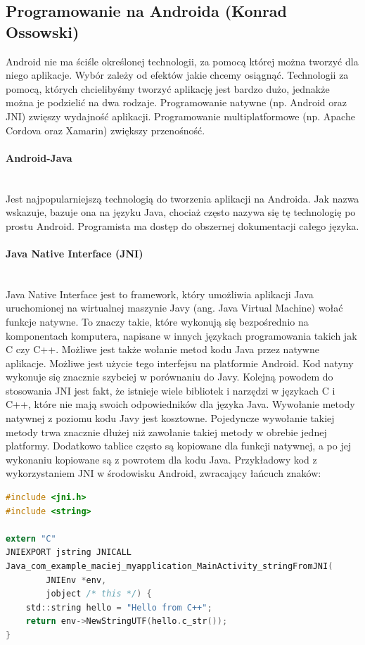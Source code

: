 \subsection{Programowanie na Androida (Konrad Ossowski)}
Android nie ma ściśle określonej technologii, za pomocą której można tworzyć dla niego aplikacje. Wybór zależy od efektów jakie chcemy osiągnąć. Technologii za pomocą, których chcielibyśmy tworzyć aplikację jest bardzo dużo, jednakże można je podzielić na dwa rodzaje. Programowanie natywne (np. Android oraz JNI) zwięszy wydajność aplikacji. Programowanie multiplatformowe (np. Apache Cordova oraz Xamarin) zwiększy przenośność. 
\paragraph{Android-Java}\mbox{}\\
Jest najpopularniejszą technologią do tworzenia aplikacji na Androida. Jak nazwa wskazuje, bazuje ona na języku Java, chociaż często nazywa się tę technologię po prostu Android. Programista ma dostęp do obszernej dokumentacji całego języka.
\paragraph{Java Native Interface (JNI)}\mbox{}\\
Java Native Interface jest to framework, który umożliwia aplikacji Java uruchomionej na wirtualnej maszynie Javy (ang. Java Virtual Machine) wołać funkcje natywne. To znaczy takie, które wykonują się bezpośrednio na komponentach komputera, napisane w innych językach programowania takich jak C czy C++. Możliwe jest także wołanie metod kodu Java przez natywne aplikacje. Możliwe jest użycie tego interfejsu na platformie Android. Kod natyny wykonuje się znacznie szybciej w porównaniu do Javy. Kolejną powodem do stosowania JNI jest fakt, że istnieje wiele bibliotek i narzędzi w językach C i C++, które nie mają swoich odpowiedników dla języka Java. Wywołanie metody natywnej z poziomu kodu Javy jest kosztowne. Pojedyncze wywołanie takiej metody trwa znacznie dłużej niż zawołanie takiej metody w obrebie jednej platformy. Dodatkowo tablice często są kopiowane dla funkcji natywnej, a po jej wykonaniu kopiowane są z powrotem dla kodu Java. Przykładowy kod z wykorzystaniem JNI w środowisku Android, zwracający łańcuch znaków: 
\begin{lstlisting}[language=C]
#include <jni.h>
#include <string>

extern "C"
JNIEXPORT jstring JNICALL
Java_com_example_maciej_myapplication_MainActivity_stringFromJNI(
        JNIEnv *env,
        jobject /* this */) {
    std::string hello = "Hello from C++";
    return env->NewStringUTF(hello.c_str());
}
\end{lstlisting}

